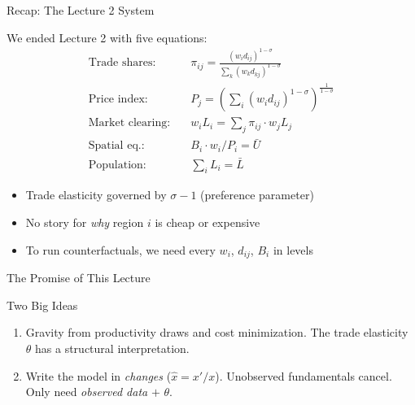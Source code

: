 \documentclass{beamer}
\begin{document}
\begin{frame}{Recap: The Lecture 2 System}

    We ended Lecture 2 with five equations:
    {\small
    \begin{align*}
        \text{Trade shares:} \quad & \pi_{ij} = \frac{(w_i d_{ij})^{1-\sigma}}{\sum_k (w_k d_{kj})^{1-\sigma}} \\
        \text{Price index:} \quad & P_j = \left(\sum_i (w_i d_{ij})^{1-\sigma}\right)^{\frac{1}{1-\sigma}} \\
        \text{Market clearing:} \quad & w_i L_i = \sum_j \pi_{ij} \cdot w_j L_j \\
        \text{Spatial eq.:} \quad & B_i \cdot w_i / P_i = \bar{U} \\
        \text{Population:} \quad & \sum_i L_i = \bar{L}
    \end{align*}
    }

    \begin{itemize}
        \item Trade elasticity governed by $\sigma - 1$ (preference parameter)
        \item No story for \emph{why} region $i$ is cheap or expensive
        \item To run counterfactuals, we need every $w_i$, $d_{ij}$, $B_i$ in levels
    \end{itemize}

\end{frame}

\begin{frame}{The Promise of This Lecture}

    \begin{block}{Two Big Ideas}
        \begin{enumerate}
            \item {} Gravity from productivity draws and cost minimization. The trade elasticity $\theta$ has a structural interpretation.
            \item {} Write the model in \emph{changes} ($\hat{x} = x'/x$). Unobserved fundamentals cancel. Only need \emph{observed data} $+$ $\theta$.
        \end{enumerate}
    \end{block}

    \vspace{0.3em}
    \begin{center}
    \end{center}

\end{frame}
\end{document}
